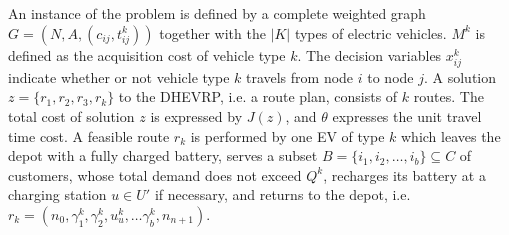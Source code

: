 \documentclass[11pt]{article}
\begin{document}
An instance of the problem is defined by a complete weighted graph $G = (N, A, (c_{ij},t^k_{ij}))$ together with the $|K|$ types of electric vehicles. $M^k$ is defined as the acquisition cost of vehicle type $k$. The decision variables $x^k_{ij}$ indicate whether or not vehicle type $k$ travels from node $i$ to node $j$. A solution $z = \{r_1, r_2, r_3, r_k\}$ to the DHEVRP, i.e. a route plan, consists of $k$ routes. The total cost of solution $z$ is expressed by $J(z)$, and $\theta$ expresses the unit travel time cost. A feasible route $r_k$ is performed by one EV of type $k$ which leaves the depot with a fully charged battery, serves a subset $B = \{i_1, i_2, \dots, i_b\} \subseteq C$ of customers, whose total demand does not exceed $Q^k$, recharges its battery at a charging station $u \in U'$ if necessary, and returns to the depot, i.e. $r_k = (n_0, \gamma^k_1, \gamma^k_2, u^k_u, \dots \gamma^k_b, n_{n+1})$. 


\end{document}
